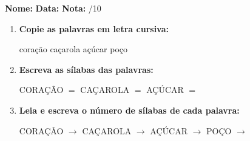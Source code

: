\begin{exercicio}



\noindent\textbf{Nome:} \underline{\hspace{3.2cm}} \quad \textbf{Data:} \underline{\hspace{1.6cm}} \quad \textbf{Nota:} \underline{\hspace{0.9cm}}/10


\begin{enumerate}

  \item \textbf{Copie as palavras em letra cursiva:}
  \begin{center}
  coração \quad caçarola \quad açúcar \quad poço
  \end{center}
  \begin{center}
  \underline{\hspace{2.4cm}} \quad \underline{\hspace{2.4cm}} \quad \underline{\hspace{2.4cm}} \quad \underline{\hspace{2.4cm}}
  \end{center}

  \item \textbf{Escreva as sílabas das palavras:}
  \begin{center}
  CORAÇÃO $=$ \underline{\hspace{1.5cm}} \underline{\hspace{1.5cm}} \quad CAÇAROLA $=$ \underline{\hspace{1.5cm}} \underline{\hspace{1.5cm}} \quad AÇÚCAR $=$ \underline{\hspace{1.5cm}} \underline{\hspace{1.5cm}}
  \end{center}

  \item \textbf{Leia e escreva o número de sílabas de cada palavra:}
  \begin{center}
  CORAÇÃO $\rightarrow$ \underline{\hspace{0.9cm}} \quad CAÇAROLA $\rightarrow$ \underline{\hspace{0.9cm}} \quad AÇÚCAR $\rightarrow$ \underline{\hspace{0.9cm}} \quad POÇO $\rightarrow$ \underline{\hspace{0.9cm}}
  \end{center}


\end{enumerate}
\end{exercicio}
